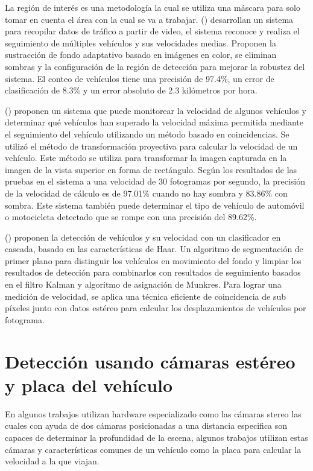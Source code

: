 La región de interés es una metodología la cual se utiliza una máscara para solo tomar en cuenta el área con la cual se va a trabajar. \citeauthor{li2014Video} (\cite{li2014Video}) desarrollan un sistema para recopilar datos de tráfico a partir de video, el sistema reconoce y realiza el seguimiento de múltiples vehículos y sus velocidades medias. Proponen la sustracción de fondo adaptativo basado en imágenes en color, se eliminan sombras y la configuración de la región de detección para mejorar la robustez del sistema. El conteo de vehículos tiene una precisión de 97.4\%, un error de clasificación de 8.3\% y un error absoluto de 2.3 kilómetros por hora. 

\citeauthor{kurniawan2018Speed} (\cite{kurniawan2018Speed}) proponen un sistema que puede monitorear la velocidad de algunos vehículos y determinar qué vehículos han superado la velocidad máxima permitida mediante el seguimiento del vehículo utilizando un método basado en coincidencias. Se utilizó el método de transformación proyectiva para calcular la velocidad de un vehículo. Este método se utiliza para transformar la imagen capturada en la imagen de la vista superior en forma de rectángulo. Según los resultados de las pruebas en el sistema a una velocidad de 30 fotogramas por segundo, la precisión de la velocidad de cálculo es de 97.01\% cuando no hay sombra y 83.86\% con sombra. Este sistema también puede determinar el tipo de vehículo de automóvil o motocicleta detectado que se rompe con una precisión del 89.62\%. 

\citeauthor{jalalat2016Vehicle} (\cite{jalalat2016Vehicle}) proponen la detección de vehículos y su velocidad con un clasificador en cascada, basado en las características de Haar. Un algoritmo de segmentación de primer plano para distinguir los vehículos en movimiento del fondo y limpiar los resultados de detección para combinarlos con resultados de seguimiento basados en el filtro Kalman y algoritmo de asignación de Munkres. Para lograr una medición de velocidad, se aplica una técnica eficiente de coincidencia de sub píxeles junto con datos estéreo para calcular los desplazamientos de vehículos por fotograma. 

\section{Detección usando cámaras estéreo y placa del vehículo }

En algunos trabajos utilizan hardware especializado como las cámaras stereo las cuales con ayuda de dos cámaras posicionadas a una distancia especifica son capaces de determinar la profundidad de la escena, algunos trabajos utilizan estas cámaras y características comunes de un vehículo como la placa para calcular la velocidad a la que viajan. 

